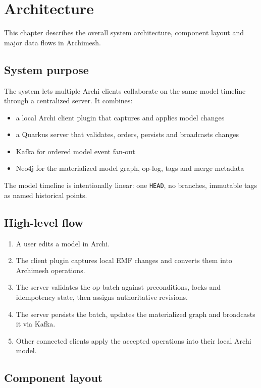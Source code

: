 \section{Architecture}
\label{sec:Architecture}

This chapter describes the overall system architecture, component layout and
major data flows in Archimesh.

\subsection{System purpose}

The system lets multiple Archi clients collaborate on the same model timeline
through a centralized server. It combines:

\begin{itemize}
\item a local Archi client plugin that captures and applies model changes
\item a Quarkus server that validates, orders, persists and broadcasts changes
\item Kafka for ordered model event fan-out
\item Neo4j for the materialized model graph, op-log, tags and merge metadata
\end{itemize}

The model timeline is intentionally linear: one \texttt{HEAD}, no branches,
immutable tags as named historical points.

\subsection{High-level flow}

\begin{enumerate}
\item A user edits a model in Archi.
\item The client plugin captures local EMF changes and converts them into
  Archimesh operations.
\item The server validates the op batch against preconditions, locks and
  idempotency state, then assigns authoritative revisions.
\item The server persists the batch, updates the materialized graph and
  broadcasts it via Kafka.
\item Other connected clients apply the accepted operations into their local
  Archi model.
\end{enumerate}

\subsection{Component layout}

